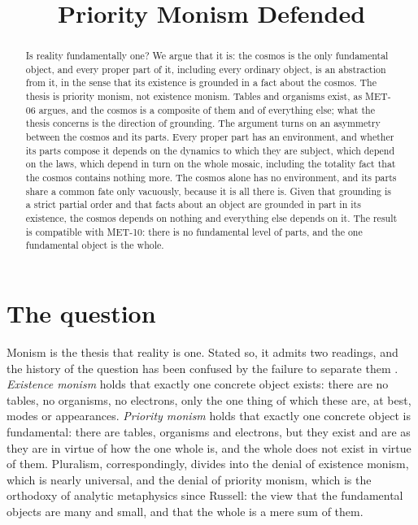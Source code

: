 \documentclass{situationist-preprint}
\title{Priority Monism Defended}
\begin{document}
\maketitle

\begin{abstract}
Is reality fundamentally one? We argue that it is: the cosmos is the only fundamental object, and every proper part of it, including every ordinary object, is an abstraction from it, in the sense that its existence is grounded in a fact about the cosmos. The thesis is priority monism, not existence monism. Tables and organisms exist, as MET-06 argues, and the cosmos is a composite of them and of everything else; what the thesis concerns is the direction of grounding. The argument turns on an asymmetry between the cosmos and its parts. Every proper part has an environment, and whether its parts compose it depends on the dynamics to which they are subject, which depend on the laws, which depend in turn on the whole mosaic, including the totality fact that the cosmos contains nothing more. The cosmos alone has no environment, and its parts share a common fate only vacuously, because it is all there is. Given that grounding is a strict partial order and that facts about an object are grounded in part in its existence, the cosmos depends on nothing and everything else depends on it. The result is compatible with MET-10: there is no fundamental level of parts, and the one fundamental object is the whole.
\end{abstract}

\section{The question}\label{s:question}

Monism is the thesis that reality is one. Stated so, it admits two readings, and the history of the question has been confused by the failure to separate them \citep{Schaffer2010}. \emph{Existence monism} holds that exactly one concrete object exists: there are no tables, no organisms, no electrons, only the one thing of which these are, at best, modes or appearances. \emph{Priority monism} holds that exactly one concrete object is fundamental: there are tables, organisms and electrons, but they exist and are as they are in virtue of how the one whole is, and the whole does not exist in virtue of them. Pluralism, correspondingly, divides into the denial of existence monism, which is nearly universal, and the denial of priority monism, which is the orthodoxy of analytic metaphysics since Russell: the view that the fundamental objects are many and small, and that the whole is a mere sum of them.
\end{document}
